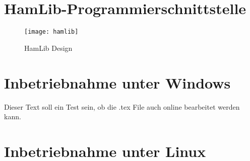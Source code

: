 \clearpage

\section{HamLib-Programmierschnittstelle}



\begin{figure}[h]
	\centering
	\texttt{[image: hamlib]}
	\caption{HamLib Design \cite{hamlib}}
	\label{fig:hamlib} 
\end{figure}

\clearpage

\section{Inbetriebnahme unter Windows}

Dieser Text soll ein Test sein, ob die .tex File auch online bearbeitet werden kann.

\section{Inbetriebnahme unter Linux}
